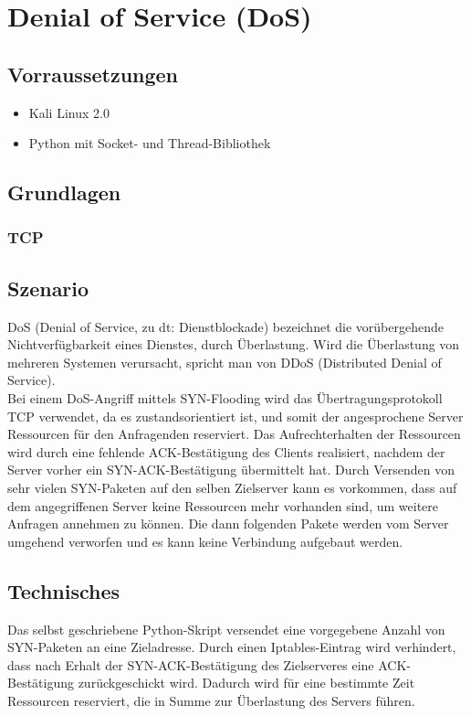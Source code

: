 \section{Denial of Service (DoS)}


\subsection*{Vorraussetzungen}

\begin{itemize}
\item Kali Linux 2.0
\item Python mit Socket- und Thread-Bibliothek
\end{itemize}


\subsection*{Grundlagen}

\subsubsection*{TCP}

\subsection*{Szenario}

DoS (Denial of Service, zu dt: Dienstblockade) bezeichnet die vorübergehende Nichtverfügbarkeit eines Dienstes, durch Überlastung. Wird die Überlastung von mehreren Systemen verursacht,
spricht man von DDoS (Distributed Denial of Service). \\
Bei einem DoS-Angriff mittels SYN-Flooding wird das Übertragungsprotokoll TCP verwendet, da es zustandsorientiert ist, und somit der angesprochene Server Ressourcen für den Anfragenden reserviert.
 Das Aufrechterhalten der Ressourcen wird durch eine fehlende ACK-Bestätigung des Clients realisiert, nachdem der Server vorher ein SYN-ACK-Bestätigung übermittelt hat. Durch Versenden von sehr vielen SYN-Paketen auf den selben Zielserver kann es vorkommen, dass auf dem angegriffenen Server keine Ressourcen mehr vorhanden sind, um weitere Anfragen annehmen zu können. Die dann folgenden Pakete werden vom Server umgehend verworfen und es kann keine Verbindung aufgebaut werden. \cite{dnssec}

\subsection*{Technisches}
Das selbst geschriebene Python-Skript versendet eine vorgegebene Anzahl von SYN-Paketen an eine Zieladresse. Durch einen Iptables-Eintrag wird verhindert, dass nach Erhalt der SYN-ACK-Bestätigung
des Zielserveres eine ACK-Bestätigung zurückgeschickt wird. Dadurch wird für eine bestimmte Zeit Ressourcen reserviert, die in Summe zur Überlastung des Servers führen.

